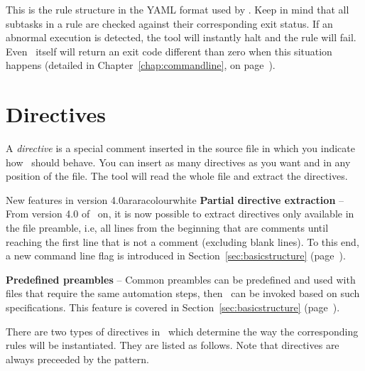 This is the rule structure in the YAML format used by \arara. Keep in mind that all subtasks in a rule are checked against their corresponding exit status. If an abnormal execution is detected, the tool will instantly halt and the rule will fail. Even \arara\ itself will return an exit code different than zero when this situation happens (detailed in Chapter~\ref{chap:commandline}, on page~\pageref{chap:commandline}).

\section{Directives}
\label{sec:directives}

A \emph{directive} is a special comment inserted in the source file in which you indicate how \arara\ should behave. You can insert as many directives as you want and in any position of the file. The tool will read the whole file and extract the directives.

\begin{messagebox}{New features in version 4.0}{araracolour}{\icinfo}{white}
\setlength{\parskip}{1em}
\textbf{Partial directive extraction} -- From version 4.0 of \arara\ on, it is now possible to extract directives only available in the file preamble, i.e, all lines from the beginning that are comments until reaching the first line that is not a comment (excluding blank lines). To this end, a new command line flag is introduced in Section~\ref{sec:basicstructure} (page~\pageref{sec:basicstructure}).

\textbf{Predefined preambles} -- Common preambles can be predefined and used with files that require the same automation steps, then \arara\ can be invoked based on such specifications. This feature is covered in Section~\ref{sec:basicstructure} (page~\pageref{sec:basicstructure}).
\end{messagebox}


There are two types of directives in \arara\ which determine the way the corresponding rules will be instantiated. They are listed as follows. Note that directives are always preceeded by the  pattern.

